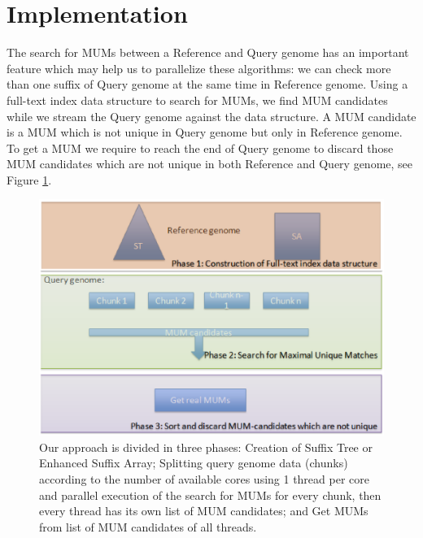 \documentclass[runningheads,a4paper]{llncs}
\begin{document}
\section{Implementation}
The search for MUMs between a Reference and Query genome has an important feature which may help us to parallelize these algorithms: we can check more than one suffix of Query genome at the same time in Reference genome. Using a full-text index data structure to search for MUMs, we find MUM candidates while we stream the Query genome against the data structure. A MUM candidate is a MUM which is not unique in Query genome but only in Reference genome. To get a MUM we require to reach the end of Query genome to discard those MUM candidates which are not unique in both Reference and Query genome, see Figure \ref{phases}.
\begin{figure}[h!] 
\centering 
\includegraphics[scale=0.35]{Phases.ps}
\caption{Our approach is divided in three phases: Creation of Suffix Tree or Enhanced Suffix Array; Splitting query genome data (chunks) according to the number of available cores using 1 thread per core and parallel execution of the search for MUMs for every chunk, then every thread has its own list of MUM candidates; and Get MUMs from list of MUM candidates of all threads.}
  \label{phases}
\end{figure}
\end{document}
